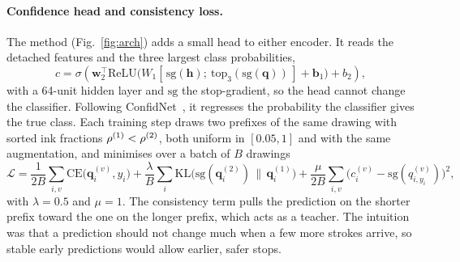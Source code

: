 \paragraph{Confidence head and consistency loss.}
\label{sec:method-head}
The method (Fig.~\ref{fig:arch}) adds a small head to either encoder. It reads the detached
features and the three largest class probabilities,
\begin{equation}
c = \sigma\!\left(\mathbf{w}_2^\top \mathrm{ReLU}\big(W_1[\,\mathrm{sg}(\mathbf{h});\
\mathrm{top}_3(\mathrm{sg}(\mathbf{q}))\,] + \mathbf{b}_1\big) + b_2\right),
\end{equation}
with a 64-unit hidden layer and $\mathrm{sg}$ the stop-gradient, so the head cannot change the
classifier. Following ConfidNet~\cite{corbiere2019confidnet}, it regresses the probability the
classifier gives the true class. Each training step draws two prefixes of the same drawing with
sorted ink fractions $\rho^{(1)} < \rho^{(2)}$, both uniform in $[0.05, 1]$ and with the same
augmentation, and minimises over a batch of $B$ drawings
\begin{equation}
\mathcal{L} = \frac{1}{2B}\sum_{i,v}\mathrm{CE}\big(\mathbf{q}_i^{(v)}, y_i\big)
+ \frac{\lambda}{B}\sum_i \mathrm{KL}\big(\mathrm{sg}(\mathbf{q}_i^{(2)}) \,\big\|\, \mathbf{q}_i^{(1)}\big)
+ \frac{\mu}{2B}\sum_{i,v}\big(c_i^{(v)} - \mathrm{sg}(q^{(v)}_{i,y_i})\big)^2,
\label{eq:loss}
\end{equation}
with $\lambda = 0.5$ and $\mu = 1$. The consistency term pulls the prediction on the shorter
prefix toward the one on the longer prefix, which acts as a teacher. The intuition was that a
prediction should not change much when a few more strokes arrive, so stable early predictions
would allow earlier, safer stops.

